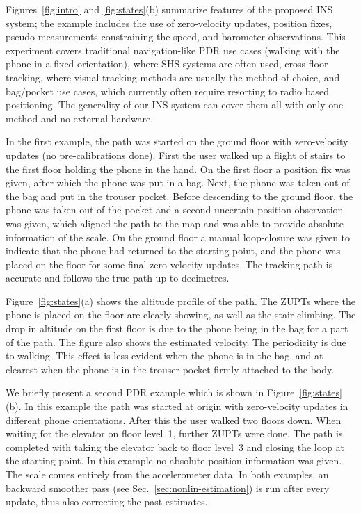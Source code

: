 \documentclass[conference]{ieeetran}
\begin{document}
Figures~\ref{fig:intro} and \ref{fig:states}(b) summarize features of the proposed INS system; the example includes the use of zero-velocity updates, position fixes, pseudo-measurements constraining the speed, and barometer observations. This experiment covers traditional navigation-like PDR use cases (walking with the phone in a fixed orientation), where SHS systems are often used, cross-floor tracking, where visual tracking methods are usually the method of choice, and bag/pocket use cases, which currently often require resorting to radio based positioning. The generality of our INS system can cover them all with only one method and no external hardware.

In the first example, the path was started on the ground floor with zero-velocity updates  (no pre-calibrations done). First the user walked up a flight of stairs to the first floor holding the phone in the hand. On the first floor a position fix was given, after which the phone was put in a bag. Next, the phone was taken out of the bag and put in the trouser pocket. Before descending to the ground floor, the phone was taken out of the pocket and a second uncertain position observation was given, which aligned the path to the map and was able to provide absolute information of the scale. On the ground floor a manual loop-closure was given to indicate that the phone had returned to the starting point, and the phone was placed on the floor for some final zero-velocity updates. The tracking path is accurate and follows the true path up to decimetres. 

Figure~\ref{fig:states}(a) shows the altitude profile of the path. The ZUPTs where the phone is placed on the floor are clearly showing, as well as the stair climbing. The drop in altitude on the first floor is due to the phone being in the bag for a part of the path. The figure also shows the estimated velocity. The periodicity is due to walking. This effect is less evident when the phone is in the bag, and at clearest when the phone is in the trouser pocket firmly attached to the body.

We briefly present a second PDR example which is shown in Figure~\ref{fig:states}(b). In this example the path was started at origin with zero-velocity updates in different phone orientations. After this the user walked two floors down. When waiting for the elevator on floor level~1, further ZUPTs were done. The path is completed with taking the elevator back to floor level~3 and closing the loop at the starting point. In this example no absolute position information was given. The scale comes entirely from the accelerometer data. In both examples, an backward smoother pass (see Sec.~\ref{sec:nonlin-estimation}) is run after every update, thus also correcting the past estimates.
\end{document}
